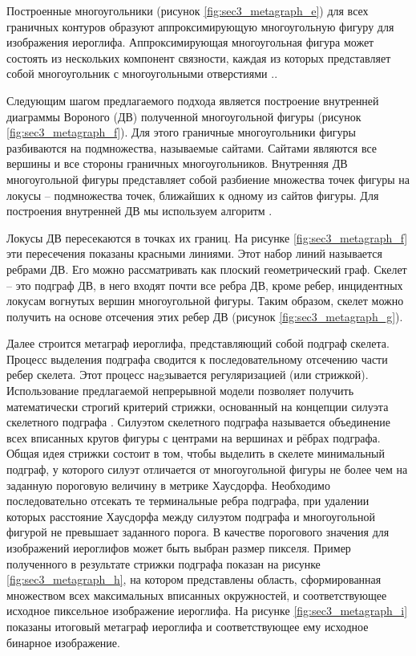 Построенные многоугольники (рисунок \cref{fig:sec3_metagraph_e}) для всех граничных контуров образуют аппроксимирующую многоугольную фигуру для изображения иероглифа. Аппроксимирующая многоугольная фигура может состоять из нескольких компонент связности, каждая из которых представляет собой многоугольник с многоугольными отверстиями \cite{mestetskiy2008binary}..

Следующим шагом предлагаемого подхода является построение внутренней диаграммы Вороного (ДВ) полученной многоугольной фигуры (рисунок \cref{fig:sec3_metagraph_f}). Для этого граничные многоугольники фигуры разбиваются на подмножества, называемые сайтами. Сайтами являются все вершины и все стороны граничных многоугольников. Внутренняя ДВ многоугольной фигуры представляет собой разбиение множества точек фигуры на локусы – подмножества точек, ближайших к одному из сайтов фигуры. Для построения внутренней ДВ мы используем алгоритм \cite{mestetskiy2024constructing}.

Локусы ДВ пересекаются в точках их границ. На рисунке \cref{fig:sec3_metagraph_f} эти пересечения показаны красными линиями. Этот набор линий называется ребрами ДВ. Его можно рассматривать как плоский геометрический граф. Скелет – это подграф ДВ, в него входят почти все ребра ДВ, кроме ребер, инцидентных локусам вогнутых вершин многоугольной фигуры. Таким образом, скелет можно получить на основе отсечения этих ребер ДВ (рисунок \cref{fig:sec3_metagraph_g}).

Далее строится метаграф иероглифа, представляющий собой подграф скелета. Процесс выделения подграфа сводится к последовательному отсечению части ребер скелета. Этот процесс наgзывается регуляризацией (или стрижкой). Использование предлагаемой непрерывной модели позволяет получить математически строгий критерий стрижки, основанный на концепции силуэта скелетного подграфа \cite{mestetskiy2024constructing}. Силуэтом скелетного подграфа называется объединение всех вписанных кругов фигуры с центрами на вершинах и рёбрах подграфа. Общая идея стрижки состоит в том, чтобы выделить в скелете минимальный подграф, у которого силуэт отличается от многоугольной фигуры не более чем на заданную пороговую величину в метрике Хаусдорфа. Необходимо последовательно отсекать те терминальные ребра подграфа, при удалении которых расстояние Хаусдорфа между силуэтом подграфа и многоугольной фигурой не превышает заданного порога. В качестве порогового значения для изображений иероглифов может быть выбран размер пикселя. Пример полученного в результате стрижки подграфа показан на рисунке \cref{fig:sec3_metagraph_h}, на котором представлены область, сформированная множеством всех максимальных вписанных окружностей, и соответствующее исходное пиксельное изображение иероглифа. На рисунке \cref{fig:sec3_metagraph_i} показаны итоговый метаграф иероглифа и соответствующее ему исходное бинарное изображение.

